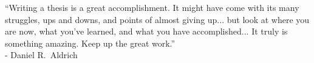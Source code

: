 ``Writing a thesis is a great accomplishment. It might have come with its many struggles, ups and downs, and points of almost giving up... but look at where you are now, what you've learned, and what you have accomplished... It truly is something amazing. Keep up the great work.''\\- Daniel R.\ Aldrich